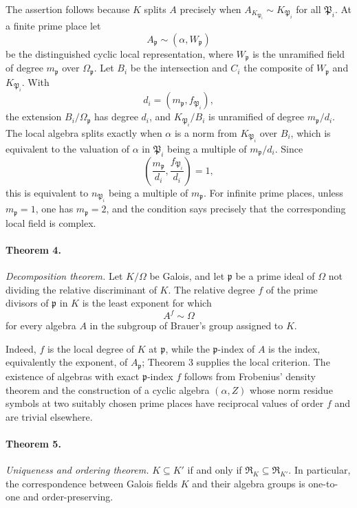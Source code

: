 \documentclass[11pt]{article}
\providecommand{\Om}{\Omega}
\begin{document}
The assertion follows because \(K\) splits \(A\) precisely when \(A_{K_{\mathfrak P_i}}\sim K_{\mathfrak P_i}\) for all \(\mathfrak P_i\). At a finite prime place let
\[
        A_{\mathfrak p}\sim(\alpha,W_{\mathfrak p})
\]
be the distinguished cyclic local representation, where \(W_{\mathfrak p}\) is the unramified field of degree \(m_{\mathfrak p}\) over \(\Om_{\mathfrak p}\). Let \(B_i\) be the intersection and \(C_i\) the composite of \(W_{\mathfrak p}\) and \(K_{\mathfrak P_i}\). With
\[
        d_i=(m_{\mathfrak p},f_{\mathfrak P_i}),
\]
the extension \(B_i/\Om_{\mathfrak p}\) has degree \(d_i\), and \(K_{\mathfrak P_i}/B_i\) is unramified of degree \(m_{\mathfrak p}/d_i\). The local algebra splits exactly when \(\alpha\) is a norm from \(K_{\mathfrak P_i}\) over \(B_i\), which is equivalent to the valuation of \(\alpha\) in \(\mathfrak P_i\) being a multiple of \(m_{\mathfrak p}/d_i\). Since
\[
        \left(\frac{m_{\mathfrak p}}{d_i},\frac{f_{\mathfrak P_i}}{d_i}\right)=1,
\]
this is equivalent to \(n_{\mathfrak P_i}\) being a multiple of \(m_{\mathfrak p}\). For infinite prime places, unless \(m_{\mathfrak p}=1\), one has \(m_{\mathfrak p}=2\), and the condition says precisely that the corresponding local field is complex.

\paragraph{Theorem 4.}
\emph{Decomposition theorem.} Let \(K/\Om\) be Galois, and let \(\mathfrak p\) be a prime ideal of \(\Om\) not dividing the relative discriminant of \(K\). The relative degree \(f\) of the prime divisors of \(\mathfrak p\) in \(K\) is the least exponent for which
\[
        A^f\sim\Om
\]
for every algebra \(A\) in the subgroup of Brauer's group assigned to \(K\).

Indeed, \(f\) is the local degree of \(K\) at \(\mathfrak p\), while the \(\mathfrak p\)-index of \(A\) is the index, equivalently the exponent, of \(A_{\mathfrak p}\); Theorem 3 supplies the local criterion. The existence of algebras with exact \(\mathfrak p\)-index \(f\) follows from Frobenius' density theorem and the construction of a cyclic algebra \((\alpha,Z)\) whose norm residue symbols at two suitably chosen prime places have reciprocal values of order \(f\) and are trivial elsewhere.

\paragraph{Theorem 5.}
\emph{Uniqueness and ordering theorem.} \(K\subseteq K'\) if and only if \(\mathfrak R_K\subseteq\mathfrak R_{K'}\). In particular, the correspondence between Galois fields \(K\) and their algebra groups is one-to-one and order-preserving.
\end{document}
